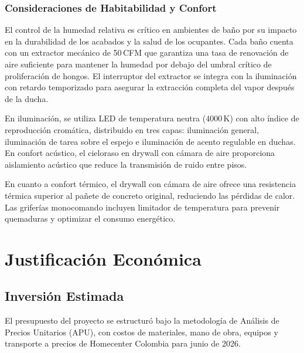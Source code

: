 ﻿\documentclass[12pt]{article}
\begin{document}
\subsubsection{Consideraciones de Habitabilidad y Confort}

El control de la humedad relativa es crítico en ambientes de baño por su impacto en
la durabilidad de los acabados y la salud de los ocupantes. Cada baño cuenta con un
extractor mecánico de 50\,CFM que garantiza una tasa de renovación de aire suficiente
para mantener la humedad por debajo del umbral crítico de proliferación de hongos.
El interruptor del extractor se integra con la iluminación con retardo temporizado
para asegurar la extracción completa del vapor después de la ducha.

En iluminación, se utiliza LED de temperatura neutra (4000\,K) con alto índice de
reproducción cromática, distribuido en tres capas: iluminación general, iluminación
de tarea sobre el espejo e iluminación de acento regulable en duchas. En confort
acústico, el cieloraso en drywall con cámara de aire proporciona aislamiento acústico
que reduce la transmisión de ruido entre pisos.

En cuanto a confort térmico, el drywall con cámara de aire ofrece una resistencia
térmica superior al pañete de concreto original, reduciendo las pérdidas de calor.
Las griferías monocomando incluyen limitador de temperatura para prevenir quemaduras
y optimizar el consumo energético.

\section{Justificación Económica}

\subsection{Inversión Estimada}

El presupuesto del proyecto se estructuró bajo la metodología de Análisis de Precios
Unitarios (APU), con costos de materiales, mano de obra, equipos y transporte a precios de
Homecenter Colombia para junio de 2026.
\end{document}

